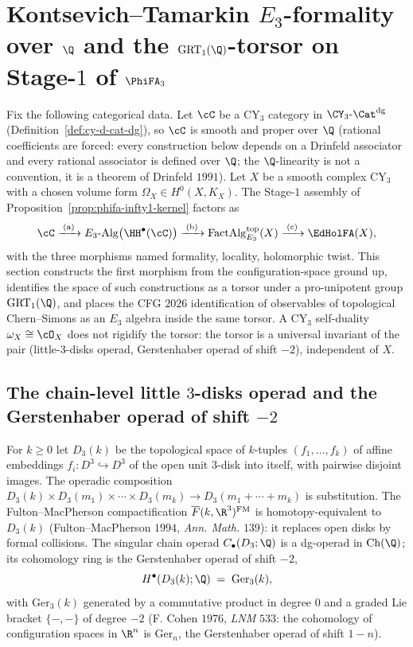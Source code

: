 \section*{Kontsevich--Tamarkin $E_3$-formality over $\Q$ and the $\mathrm{GRT}_1(\Q)$-torsor on Stage-$1$ of $\PhiFA_3$}
\label{sec:kt-e3-formality-grt1-torsor-cfg2026}

Fix the following categorical data. Let $\cC$ be a CY$_3$ category in
$\CY_3\text{-}\Cat^{\mathrm{dg}}$ (Definition~\ref{def:cy-d-cat-dg}),
so $\cC$ is smooth and proper over $\Q$ (rational coefficients are
forced: every construction below depends on a Drinfeld associator and
every rational associator is defined over $\Q$; the $\Q$-linearity is
not a convention, it is a theorem of Drinfeld $1991$). Let $X$ be a
smooth complex CY$_3$ with a chosen volume form $\Omega_X \in H^0(X,
K_X)$. The Stage-$1$ assembly of Proposition~\ref{prop:phifa-infty1-kernel}
factors as
\[
 \cC
 \xrightarrow{\;\mathrm{(a)}\;}
 E_3\text{-}\mathrm{Alg}\bigl(\HH^\bullet(\cC)\bigr)
 \xrightarrow{\;\mathrm{(b)}\;}
 \mathrm{FactAlg}^{\mathrm{top}}_{E_3}(X)
 \xrightarrow{\;\mathrm{(c)}\;}
 \EdHolFA(X),
\]
with the three morphisms named formality, locality, holomorphic twist.
This section constructs the first morphism from the configuration-space
ground up, identifies the space of such constructions as a torsor under
a pro-unipotent group $\mathrm{GRT}_1(\Q)$, and places the CFG $2026$
identification of observables of topological Chern--Simons as an $E_3$
algebra inside the same torsor. A CY$_3$ self-duality
$\omega_X \cong \cO_X$ does not rigidify the torsor: the torsor is a
universal invariant of the pair (little-$3$-disks operad, Gerstenhaber
operad of shift $-2$), independent of $X$.

\subsection*{The chain-level little $3$-disks operad and the Gerstenhaber operad of shift $-2$}

\begin{definition}[Little $3$-disks operad $E_3 = D_3$]
\label{def:little-3-disks-cfg}
\ClaimStatusDefinitional
For $k \geq 0$ let $D_3(k)$ be the topological space of $k$-tuples
$(f_1, \ldots, f_k)$ of affine embeddings $f_i \colon D^3 \hookrightarrow D^3$
of the open unit $3$-disk into itself, with pairwise disjoint images.
The operadic composition $D_3(k) \times D_3(m_1) \times \cdots \times
D_3(m_k) \to D_3(m_1 + \cdots + m_k)$ is substitution. The Fulton--MacPherson
compactification $\overline{F}(k, \R^3)^{\mathrm{FM}}$ is homotopy-equivalent
to $D_3(k)$ (Fulton--MacPherson $1994$, \textit{Ann. Math.} $139$): it
replaces open disks by formal collisions. The singular chain operad
$C_\bullet(D_3; \Q)$ is a dg-operad in $\mathrm{Ch}(\Q)$; its cohomology
ring is the Gerstenhaber operad of shift $-2$,
\[
 H^\bullet(D_3(k); \Q) \;=\; \mathrm{Ger}_3(k),
\]
with $\mathrm{Ger}_3(k)$ generated by a commutative product in degree $0$ and a
graded Lie bracket $\{-, -\}$ of degree $-2$ (F. Cohen $1976$,
\textit{LNM} $533$: the cohomology of configuration spaces in $\R^n$
is $\mathrm{Ger}_n$, the Gerstenhaber operad of shift $1 - n$).
\end{definition}

